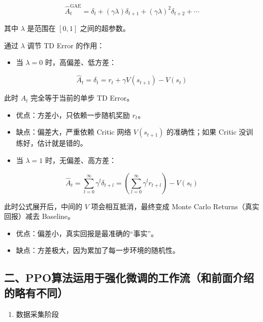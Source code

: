 \[
\hat{A}_t^{\mathrm{GAE}}
=
\delta_t
+
(\gamma\lambda)\delta_{t+1}
+
(\gamma\lambda)^2\delta_{t+2}
+
\cdots
\]

其中 \(\lambda\) 是范围在 \([0,1]\) 之间的超参数。

通过 \(\lambda\) 调节 TD Error 的作用：

\begin{itemize}
\tightlist
\item
{}
  当 \(\lambda = 0\) 时，高偏差、低方差：
\end{itemize}

\[
\hat{A}_t = \delta_t = r_t + \gamma V(s_{t+1}) - V(s_t)
\]

此时 \(A_t\) 完全等于当前的单步 TD Error。

\begin{itemize}
\tightlist
\item
  优点：方差小，只依赖一步随机奖励 \(r_t\)。
\item
  缺点：偏差大，严重依赖 Critic 网络 \(V(s_{t+1})\) 的准确性；如果 Critic 没训练好，估计就是错的。
\item
{}
  当 \(\lambda = 1\) 时，无偏差、高方差：
\end{itemize}

\[
\hat{A}_t
=
\sum_{l=0}^{\infty}\gamma^l\delta_{t+l}
=
\left(\sum_{l=0}^{\infty}\gamma^l r_{t+l}\right)
- V(s_t)
\]

此时公式展开后，中间的 \(V\) 项会相互抵消，最终变成 Monte Carlo Returns（真实回报）减去 Baseline。

\begin{itemize}
\tightlist
\item
  优点：偏差小，真实回报是最准确的``事实''。
\item
  缺点：方差极大，因为累加了每一步环境的随机性。
\end{itemize}

\hypertarget{ux4e8cppoux7b97ux6cd5ux8fd0ux7528ux4e8eux5f3aux5316ux5faeux8c03ux7684ux5de5ux4f5cux6d41ux548cux524dux9762ux4ecbux7ecdux7684ux7565ux6709ux4e0dux540c}{%
\subsection{二、PPO算法运用于强化微调的工作流（和前面介绍的略有不同）}\label{ux4e8cppoux7b97ux6cd5ux8fd0ux7528ux4e8eux5f3aux5316ux5faeux8c03ux7684ux5de5ux4f5cux6d41ux548cux524dux9762ux4ecbux7ecdux7684ux7565ux6709ux4e0dux540c}}

\begin{enumerate}
\def\labelenumi{\arabic{enumi}.}
\tightlist
\item
  数据采集阶段
\end{enumerate}

